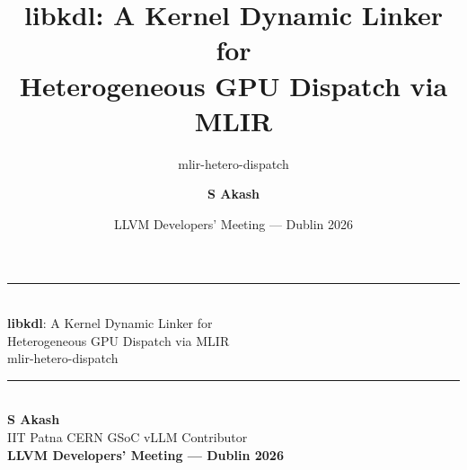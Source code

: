 \documentclass[aspectratio=169,10pt]{beamer}
\title{\textbf{libkdl}: A Kernel Dynamic Linker for\\Heterogeneous GPU Dispatch via MLIR}
\subtitle{mlir-hetero-dispatch}
\author{\textbf{S Akash}}
\institute{IIT Patna \;\textbar\; CERN GSoC \;\textbar\; vLLM Contributor}
\date{LLVM Developers' Meeting --- Dublin 2026}
\begin{document}
\begin{frame}[plain]
  \vfill
  \begin{center}
    {\color{LLVMorange}\rule{0.6\textwidth}{2pt}}\\[1em]
    {\LARGE\color{LLVMdark}\textbf{libkdl}: A Kernel Dynamic Linker for\\[0.3em]
     Heterogeneous GPU Dispatch via MLIR}\\[0.8em]
    {\color{LLVMblue}\large mlir-hetero-dispatch}\\[1.5em]
    {\color{LLVMorange}\rule{0.4\textwidth}{1pt}}\\[1em]
    {\large\textbf{S Akash}}\\[0.3em]
    {\color{LLVMgray} IIT Patna \;\textbar\; CERN GSoC \;\textbar\; vLLM Contributor}\\[1.5em]
    {\color{LLVMteal}\textbf{LLVM Developers' Meeting --- Dublin 2026}}
  \end{center}
  \vfill
\end{frame}
\end{document}

